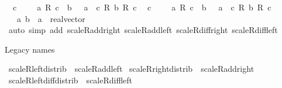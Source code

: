 \begin{isabellebody}
\ \ {\isachardoublequoteopen}c\ {\isasymnoteq}\ {}\ {\isasymLongrightarrow}\ {\isacharminus}{\kern0pt}\ {\isacharparenleft}{\kern0pt}a\ {\isacharslash}{\kern0pt}\isactrlsub R\ c{\isacharparenright}{\kern0pt}\ {\isacharplus}{\kern0pt}\ b\ {\isacharequal}{\kern0pt}\ {\isacharparenleft}{\kern0pt}{\isacharminus}{\kern0pt}\ a\ {\isacharplus}{\kern0pt}\ c\ {\isacharasterisk}{\kern0pt}\isactrlsub R\ b{\isacharparenright}{\kern0pt}\ {\isacharslash}{\kern0pt}\isactrlsub R\ c{\isachardoublequoteclose}\isanewline
\ \ {\isachardoublequoteopen}c\ {\isasymnoteq}\ {}\ {\isasymLongrightarrow}\ {\isacharminus}{\kern0pt}\ {\isacharparenleft}{\kern0pt}a\ {\isacharslash}{\kern0pt}\isactrlsub R\ c{\isacharparenright}{\kern0pt}\ {\isacharminus}{\kern0pt}\ b\ {\isacharequal}{\kern0pt}\ {\isacharparenleft}{\kern0pt}{\isacharminus}{\kern0pt}\ a\ {\isacharminus}{\kern0pt}\ c\ {\isacharasterisk}{\kern0pt}\isactrlsub R\ b{\isacharparenright}{\kern0pt}\ {\isacharslash}{\kern0pt}\isactrlsub R\ c{\isachardoublequoteclose}\isanewline
\ \ \ a\ b\ {\isacharcolon}{\kern0pt}{\isacharcolon}{\kern0pt}\ {\isachardoublequoteopen}{\isacharprime}{\kern0pt}a\ {\isacharcolon}{\kern0pt}{\isacharcolon}{\kern0pt}\ real{\isacharunderscore}{\kern0pt}vector{\isachardoublequoteclose}\isanewline
%
\isadelimproof
\ \ %
\endisadelimproof
%
\isatagproof
{}\isamarkupfalse%
\ {\isacharparenleft}{\kern0pt}auto\ simp\ add{\isacharcolon}{\kern0pt}\ scaleR{\isacharunderscore}{\kern0pt}add{\isacharunderscore}{\kern0pt}right\ scaleR{\isacharunderscore}{\kern0pt}add{\isacharunderscore}{\kern0pt}left\ scaleR{\isacharunderscore}{\kern0pt}diff{\isacharunderscore}{\kern0pt}right\ scaleR{\isacharunderscore}{\kern0pt}diff{\isacharunderscore}{\kern0pt}left{\isacharparenright}{\kern0pt}%
\endisatagproof
{\isafoldproof}%
%
\isadelimproof
%
\endisadelimproof
%
\begin{isamarkuptext}%
Legacy names%
\end{isamarkuptext}\isamarkuptrue%
\isamarkupfalse%
\ scaleR{\isacharunderscore}{\kern0pt}left{\isacharunderscore}{\kern0pt}distrib\ {\isacharequal}{\kern0pt}\ scaleR{\isacharunderscore}{\kern0pt}add{\isacharunderscore}{\kern0pt}left\isanewline
{}\isamarkupfalse%
\ scaleR{\isacharunderscore}{\kern0pt}right{\isacharunderscore}{\kern0pt}distrib\ {\isacharequal}{\kern0pt}\ scaleR{\isacharunderscore}{\kern0pt}add{\isacharunderscore}{\kern0pt}right\isanewline
{}\isamarkupfalse%
\ scaleR{\isacharunderscore}{\kern0pt}left{\isacharunderscore}{\kern0pt}diff{\isacharunderscore}{\kern0pt}distrib\ {\isacharequal}{\kern0pt}\ scaleR{\isacharunderscore}{\kern0pt}diff{\isacharunderscore}{\kern0pt}left\isanewline

\end{isabellebody}
